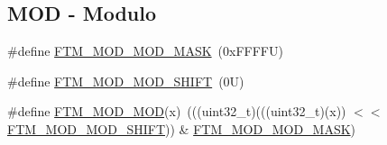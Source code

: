 \subsection*{M\+OD -\/ Modulo}
\begin{DoxyCompactItemize}
\item 
\#define \mbox{\hyperlink{group___f_t_m___register___masks_gae815072c26d186e4ad07654080c7cb97}{F\+T\+M\+\_\+\+M\+O\+D\+\_\+\+M\+O\+D\+\_\+\+M\+A\+SK}}~(0x\+F\+F\+F\+F\+U)
\item 
\#define \mbox{\hyperlink{group___f_t_m___register___masks_gac10320219038f5acd0cc6ed04c4f1f48}{F\+T\+M\+\_\+\+M\+O\+D\+\_\+\+M\+O\+D\+\_\+\+S\+H\+I\+FT}}~(0\+U)
\item 
\#define \mbox{\hyperlink{group___f_t_m___register___masks_ga80e3c2799c6f4480a6b8c983783ee052}{F\+T\+M\+\_\+\+M\+O\+D\+\_\+\+M\+OD}}(x)~(((uint32\+\_\+t)(((uint32\+\_\+t)(x)) $<$$<$ \mbox{\hyperlink{group___f_t_m___register___masks_gac10320219038f5acd0cc6ed04c4f1f48}{F\+T\+M\+\_\+\+M\+O\+D\+\_\+\+M\+O\+D\+\_\+\+S\+H\+I\+FT}})) \& \mbox{\hyperlink{group___f_t_m___register___masks_gae815072c26d186e4ad07654080c7cb97}{F\+T\+M\+\_\+\+M\+O\+D\+\_\+\+M\+O\+D\+\_\+\+M\+A\+SK}})
\end{DoxyCompactItemize}
